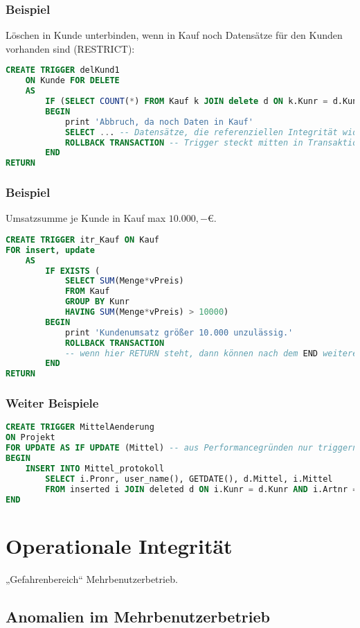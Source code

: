 \subsubsection*{Beispiel}
Löschen in Kunde unterbinden, wenn in Kauf noch Datensätze für den Kunden vorhanden sind (RESTRICT):
\begin{lstlisting}[language=SQL]
CREATE TRIGGER delKund1
	ON Kunde FOR DELETE
	AS
		IF (SELECT COUNT(*) FROM Kauf k JOIN delete d ON k.Kunr = d.Kunr) > 0
		BEGIN
			print 'Abbruch, da noch Daten in Kauf'
			SELECT ... -- Datensätze, die referenziellen Integrität widersprechen auch mit print ausgeben
			ROLLBACK TRANSACTION -- Trigger steckt mitten in Transaktion, deswegen kann hier ein Rollback der Transaktion veranlasst werden, obwohl sie hier nicht explizit begonnen wurde
		END
RETURN
\end{lstlisting}
\subsubsection*{Beispiel}
Umsatzsumme je Kunde in Kauf max $10.000,-$\euro{}.
\begin{lstlisting}[language=SQL]
CREATE TRIGGER itr_Kauf ON Kauf
FOR insert, update
	AS
		IF EXISTS (
			SELECT SUM(Menge*vPreis)
			FROM Kauf
			GROUP BY Kunr
			HAVING SUM(Menge*vPreis) > 10000)
		BEGIN
			print 'Kundenumsatz größer 10.000 unzulässig.'
			ROLLBACK TRANSACTION
			-- wenn hier RETURN steht, dann können nach dem END weitere Bedingungen (IF...) angehängt werden.
		END
RETURN
\end{lstlisting}
\subsubsection*{Weiter Beispiele}
\begin{lstlisting}[language=SQL]
CREATE TRIGGER MittelAenderung
ON Projekt
FOR UPDATE AS IF UPDATE (Mittel) -- aus Performancegründen nur triggern, wenn Mittel geändert
BEGIN
	INSERT INTO Mittel_protokoll
		SELECT i.Pronr, user_name(), GETDATE(), d.Mittel, i.Mittel
		FROM inserted i JOIN deleted d ON i.Kunr = d.Kunr AND i.Artnr = d.Artnr
END
\end{lstlisting}

\section{Operationale Integrität}
„Gefahrenbereich“ Mehrbenutzerbetrieb.
\subsection{Anomalien im Mehrbenutzerbetrieb}
